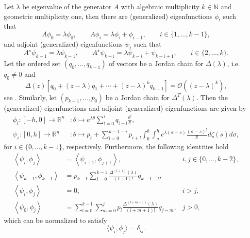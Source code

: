 \begin{proposition}
\label{btdde:proposition:eigenvalues_multiplicity_k}
Let $\lambda$ be eigenvalue of the generator $A$ with algebraic multiplicity
$k\in\mathbb N$ and geometric multiplicity one, then there are (generalized)
eigenfunctions $\phi_i$ such that
%
\begin{equation}
\label{btdde:eq:eigenspaces_eigenfunctions}
A\phi_0 = \lambda\phi_0,\qquad A\phi_i = \lambda\phi_i + \phi_{i-1}, \qquad i \in \{1,\dots,k-1\},
\end{equation}
%
and adjoint (generalized) eigenfunctions $\psi_i$ such
that
%
\begin{equation}
\label{btdde:eq:eigenspaces_ad_eigenfunctions}
A^{\star}\psi_{k-1} = \lambda\psi_{k-1}, \qquad 
    A^{\star}\psi_{k-i} = \lambda\psi_{k-i} + \psi_{k-i + 1}, \qquad i \in \{2,\dots,k\}.
\end{equation}
%
Let the ordered set $(q_0,\dots,q_{k-1})$ of vectors be a Jordan chain for $\Delta(\lambda)$, i.e.
$q_0 \neq 0$ and 
\[
    \Delta(z)[q_0 + (z-\lambda) q_1 + \cdots + (z-\lambda)^k q_{k-1}] = \mathcal O((z-\lambda)^k),
\]
see \cite[Chapter IV.4]{diekmann1995delay}.
Similarly, let $(p_{k-1},\dots,p_0)$ be a Jordan chain for $\Delta^T(\lambda)$.
Then the (generalized) eigenfunctions and adjoint (generalized) eigenfunctions are given by 
\begin{equation}
\label{btdde:eq:eigenfunction_and_adjoint_eigenfunctions}
\begin{aligned}
\phi_i \colon [-h,0] \rightarrow \mathbb R^n &\colon \theta \mapsto e^{\lambda\theta} \sum_{l=0}^i q_{i-l} \frac{\theta^l}{l!}, \\
\psi_i \colon [0,h]  \rightarrow \mathbb R^n &\colon \theta \mapsto p_i + \sum_{l=0}^{k-1-i} p_{i + l} \int_0^\theta \int_{\sigma}^h 
    e^{\lambda(\sigma-s)}\frac{(\sigma-s)^{l}}{l!} d\zeta(s) d\sigma,
\end{aligned}
\end{equation}
for $i \in \{0,\dots, k-1\}$, respectively.
Furthermore, the following identities hold
%
\begin{equation}
\label{btdde:eq:eigenfunction_identities}
\begin{aligned}
\left<\psi_i,\phi_j\right> & = \left<\psi_{i + 1},\phi_{j + 1}\right>, & i,j\in\{0,\dots,k-2\},\\
\left<\psi_{k-1},\phi_{k-1}\right> & = p_{k-1} \sum_{l=0}^{k-1} \frac{\Delta^{(l + 1)}(\lambda)}{(l + 1)!}q_{k-1-l}, \\
\left<\psi_i,\phi_j\right> & = 0, & i>j, \\
\left<\psi_0,\phi_j\right> &= \sum_{l=0}^{k-1} \sum_{m=0}^j p_l \frac{\Delta^{(l + m+1)}(\lambda)}{(l + m+1)!} q_{j-m}, 
                                 & j>0,
\end{aligned}
\end{equation}
which can be normalized to satisfy 
\begin{equation}
    \label{btdde:eq:normalization_identity}
    \langle\psi_i,\phi_j\rangle = \delta_{ij}.
\end{equation}
\end{proposition}

